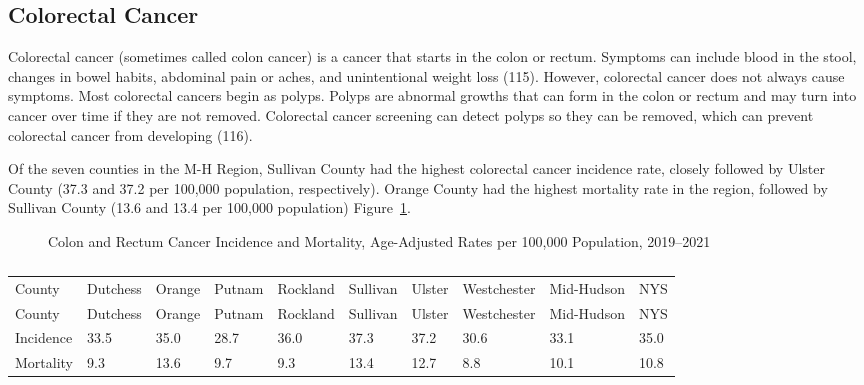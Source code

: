 \documentclass[
  english,
  letterpaper,
]{report}
\begin{document}
\subsection{Colorectal Cancer}\label{colorectal-cancer}

Colorectal cancer (sometimes called colon cancer) is a cancer that
starts in the colon or rectum. Symptoms can include blood in the stool,
changes in bowel habits, abdominal pain or aches, and unintentional
weight loss (115). However, colorectal cancer does not always cause
symptoms. Most colorectal cancers begin as polyps. Polyps are abnormal
growths that can form in the colon or rectum and may turn into cancer
over time if they are not removed. Colorectal cancer screening can
detect polyps so they can be removed, which can prevent colorectal
cancer from developing (116).

Of the seven counties in the M-H Region, Sullivan County had the highest
colorectal cancer incidence rate, closely followed by Ulster County
(37.3 and 37.2 per 100,000 population, respectively). Orange County had
the highest mortality rate in the region, followed by Sullivan County
(13.6 and 13.4 per 100,000 population)
Figure~\ref{fig-colonrectca-incident-mortal-aar}.

\begin{figure}


\caption{\label{fig-colonrectca-incident-mortal-aar}Colon and Rectum
Cancer Incidence and Mortality, Age-Adjusted Rates per 100,000
Population, 2019--2021}

\end{figure}%

\begin{longtable}[]{@{}llllllllll@{}}

\caption{\label{tbl-colonrectca-incident-mortal-aar}Colon and Rectum
Cancer Incidence and Mortality, Age-Adjusted Rates per 100,000
Population, 2019--2021}

\tabularnewline

\caption{}\label{T_449c2}\tabularnewline
\toprule\noalign{}
County & Dutchess & Orange & Putnam & Rockland & Sullivan & Ulster &
Westchester & Mid-Hudson & NYS \\
\midrule\noalign{}
\endfirsthead
\toprule\noalign{}
County & Dutchess & Orange & Putnam & Rockland & Sullivan & Ulster &
Westchester & Mid-Hudson & NYS \\
\midrule\noalign{}
\endhead
\bottomrule\noalign{}
\endlastfoot
Incidence & 33.5 & 35.0 & 28.7 & 36.0 & 37.3 & 37.2 & 30.6 & 33.1 &
35.0 \\
Mortality & 9.3 & 13.6 & 9.7 & 9.3 & 13.4 & 12.7 & 8.8 & 10.1 & 10.8 \\

\end{longtable}
\end{document}

